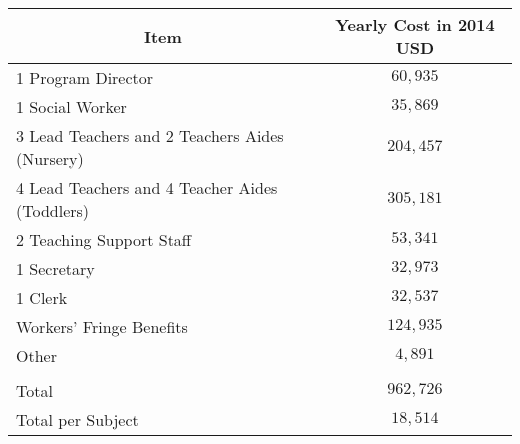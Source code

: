 \begin{tabular}{lc} \toprule
\multicolumn{1}{c}{Item} & Yearly Cost in 2014 USD \\ \midrule
1 Program Director & $60,935$ \\ 
1 Social Worker      &  $35,869$ \\ 
3 Lead Teachers and 2 Teachers Aides (Nursery)  & $204,457$ \\
4 Lead Teachers and 4 Teacher Aides  (Toddlers) & $305,181$ \\ 
2 Teaching Support Staff & $53,341$ \\ 
1 Secretary & $32,973$ \\ 
1 Clerk        & $32,537$ \\ 
Workers' Fringe Benefits & $124,935$ \\ 
Other & $4, 891$ \\ \\ \midrule 
Total  & $962,726$ \\ 
Total per Subject & $18,514$ \\ \bottomrule
\end{tabular}